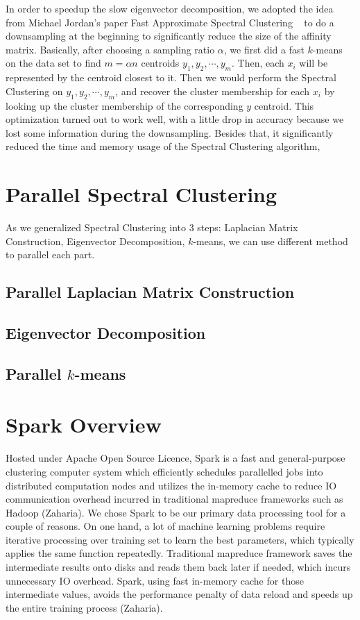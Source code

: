 \documentclass{acm_proc_article-sp}
\begin{document}
In order to speedup the slow eigenvector decomposition, we adopted the idea from Michael Jordan's paper Fast Approximate Spectral Clustering ~\cite{yan2009fast} to do a downsampling at the beginning to significantly reduce the size of the affinity matrix. Basically, after choosing a sampling ratio $\alpha$, we first did a fast $k$-means on the data set to find $m = \alpha n$ centroids $y_1, y_2, \cdots, y_m$. Then, each $x_i$ will be represented by the centroid closest to it. Then we would perform the Spectral Clustering on $y_1, y_2, \cdots, y_m$, and recover the cluster membership for each $x_i$ by looking up the cluster membership of the corresponding $y$ centroid. This optimization turned out to work well, with a little drop in accuracy because we lost some information during the downsampling. Besides that, it significantly reduced the time and memory usage of the Spectral Clustering algorithm,


\section{Parallel Spectral Clustering}
As we generalized Spectral Clustering into 3 steps: Laplacian Matrix Construction, Eigenvector Decomposition, $k$-means, we can use different method to parallel each part.

\subsection{Parallel Laplacian Matrix Construction}

\subsection{Eigenvector Decomposition}

\subsection{Parallel $k$-means}


\section{Spark Overview}
Hosted under Apache Open Source Licence, Spark is a fast and general-purpose clustering computer system which efficiently schedules parallelled jobs into distributed computation nodes and utilizes the in-memory cache to reduce IO communication overhead incurred in traditional mapreduce frameworks such as Hadoop (Zaharia). We chose  Spark to be our primary data processing tool for a couple of reasons. On one hand, a lot of machine learning problems require iterative processing over training set to learn the best parameters, which typically applies the same function repeatedly. Traditional mapreduce framework saves the intermediate results onto disks and reads them back later if needed, which incurs unnecessary IO overhead. Spark, using fast in-memory cache for those intermediate values, avoids the performance penalty of data reload and speeds up the entire training process (Zaharia).
\end{document}
